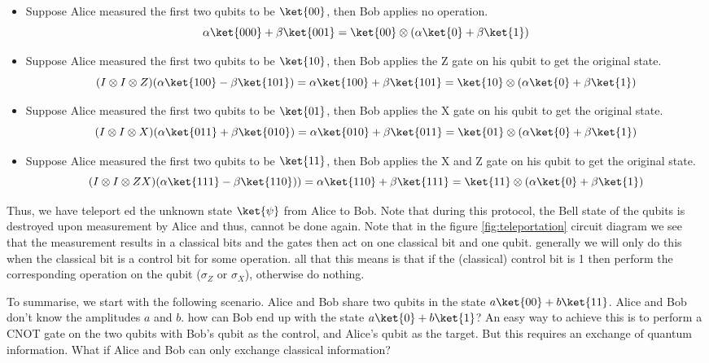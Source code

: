 \documentclass[12pt, oneside]{book}
\theoremstyle{definition}
\theoremstyle{definition}
\theoremstyle{remark}
\begin{document}
\begin{enumerate}
    \begin{itemize}
        \item Suppose Alice measured the first two qubits to be $\ket{00}$, then Bob applies no operation.
        \[
            \alpha\ket{000}+\beta\ket{001}=\ket{00}\otimes (\alpha\ket{0}+\beta\ket{1})
        \]
        \item Suppose Alice measured the first two qubits to be $\ket{10}$, then Bob applies the Z gate on his qubit to get the original state.
        \[ 
            (I\otimes I \otimes Z)(\alpha\ket{100}-\beta\ket{101})=\alpha\ket{100}+\beta\ket{101}=\ket{10}\otimes (\alpha\ket{0}+\beta\ket{1})
        \]
        \item Suppose Alice measured the first two qubits to be $\ket{01}$, then Bob applies the X gate on his qubit to get the original state.
        \[ 
            (I\otimes I\otimes X)(\alpha\ket{011}+\beta\ket{010})=\alpha\ket{010}+\beta\ket{011}=\ket{01}\otimes (\alpha\ket{0}+\beta\ket{1})
        \]
        \item Suppose Alice measured the first two qubits to be $\ket{11}$, then Bob applies the X and Z gate on his qubit to get the original state.
        \[ 
          (I\otimes I\otimes ZX)(\alpha\ket{111}-\beta\ket{110}))=\alpha\ket{110}+\beta\ket{111}=\ket{11}\otimes (\alpha\ket{0}+\beta\ket{1})
        \]
    \end{itemize}
    Thus, we have teleport ed the unknown state $\ket{\psi}$ from Alice to Bob. Note that during this protocol, the Bell state of the qubits is destroyed upon measurement by Alice and thus, cannot be done again. Note that in the figure \ref{fig:teleportation} circuit diagram we see that the measurement results in a classical bits and the gates then act on one classical bit and one qubit. generally we will only do this when the classical bit is a control bit for some operation. all that this means is that if the (classical) control bit is 1 then perform the corresponding operation on the qubit ($\sigma_Z$ or $\sigma_X$), otherwise do nothing.
\end{enumerate}
To summarise, we start with the following scenario. Alice and Bob share two qubits in the state $a\ket{00}+b\ket{11}$. Alice and Bob don't know the amplitudes $a$ and $b$. how can Bob end up with the state $a\ket{0}+b\ket{1}$? An easy way to achieve this is to perform a CNOT gate on the two qubits with Bob's qubit as the control, and Alice's qubit as the target. But this requires an exchange of quantum information. What if Alice and Bob can only exchange classical information?
\end{document}
